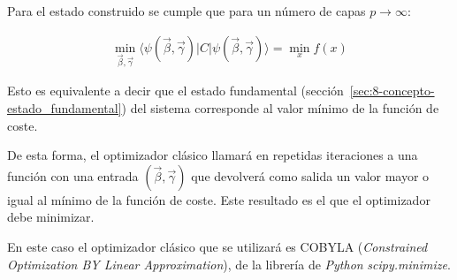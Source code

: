 Para el estado construido se cumple que para un número de capas $p \rightarrow \infty$:

\begin{align}
  \min_{\vec{\beta}, \vec{\gamma}} \langle \psi(\vec{\beta}, \vec{\gamma}) \rvert C \lvert \psi(\vec{\beta}, \vec{\gamma}) \rangle = \min_{x} f(x)
\end{align}

Esto es equivalente a decir que el estado fundamental (sección~\ref{sec:8-concepto-estado_fundamental}) del sistema corresponde al valor mínimo de la función de coste.

De esta forma, el optimizador clásico llamará en repetidas iteraciones a una función con una entrada $(\vec{\beta}, \vec{\gamma})$ que devolverá como salida un valor mayor o igual al mínimo de la función de coste.
Este resultado es el que el optimizador debe minimizar.

En este caso el optimizador clásico que se utilizará es COBYLA (\textit{Constrained Optimization BY Linear Approximation}), de la librería de \textit{Python} \textit{scipy.minimize}.


